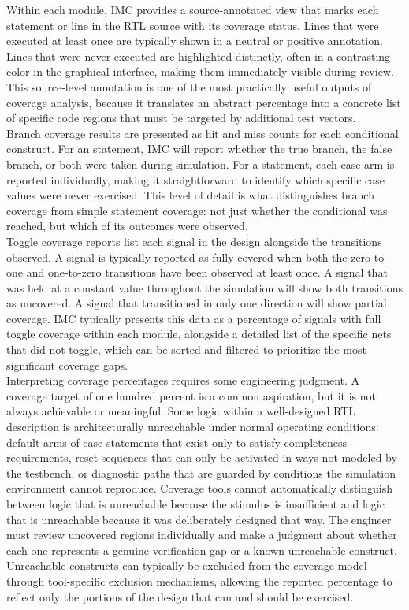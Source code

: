Within each module, IMC provides a source-annotated view that marks each statement or line in the RTL source with its coverage status. Lines that were executed at least once are typically shown in a neutral or positive annotation. Lines that were never executed are highlighted distinctly, often in a contrasting color in the graphical interface, making them immediately visible during review. This source-level annotation is one of the most practically useful outputs of coverage analysis, because it translates an abstract percentage into a concrete list of specific code regions that must be targeted by additional test vectors.\\

Branch coverage results are presented as hit and miss counts for each conditional construct. For an  statement, IMC will report whether the true branch, the false branch, or both were taken during simulation. For a  statement, each case arm is reported individually, making it straightforward to identify which specific case values were never exercised. This level of detail is what distinguishes branch coverage from simple statement coverage: not just whether the conditional was reached, but which of its outcomes were observed.\\

Toggle coverage reports list each signal in the design alongside the transitions observed. A signal is typically reported as fully covered when both the zero-to-one and one-to-zero transitions have been observed at least once. A signal that was held at a constant value throughout the simulation will show both transitions as uncovered. A signal that transitioned in only one direction will show partial coverage. IMC typically presents this data as a percentage of signals with full toggle coverage within each module, alongside a detailed list of the specific nets that did not toggle, which can be sorted and filtered to prioritize the most significant coverage gaps.\\

Interpreting coverage percentages requires some engineering judgment. A coverage target of one hundred percent is a common aspiration, but it is not always achievable or meaningful. Some logic within a well-designed RTL description is architecturally unreachable under normal operating conditions: default arms of case statements that exist only to satisfy completeness requirements, reset sequences that can only be activated in ways not modeled by the testbench, or diagnostic paths that are guarded by conditions the simulation environment cannot reproduce. Coverage tools cannot automatically distinguish between logic that is unreachable because the stimulus is insufficient and logic that is unreachable because it was deliberately designed that way. The engineer must review uncovered regions individually and make a judgment about whether each one represents a genuine verification gap or a known unreachable construct. Unreachable constructs can typically be excluded from the coverage model through tool-specific exclusion mechanisms, allowing the reported percentage to reflect only the portions of the design that can and should be exercised.\\

